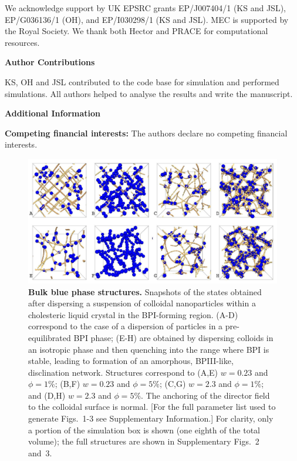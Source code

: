 \documentclass[12pt]{article}
\begin{document}
\noindent
We acknowledge support by UK EPSRC grants EP/J007404/1 (KS and JSL), 
EP/G036136/1 (OH), and EP/I030298/1 (KS and JSL).
MEC is supported by the Royal Society.
We thank both Hector and PRACE for computational resources.

\bigskip
\noindent
\textbf{\large Author Contributions}

\noindent
KS, OH and JSL contributed to the code base for simulation and performed
simulations. All authors helped to analyse the results and write the
manuscript.

\bigskip
\noindent
\textbf{\large Additional Information}

\noindent
\textbf{Competing financial interests:} The authors declare no competing
financial interests.

\newpage

\begin{figure}

\centerline{\includegraphics[width=\textwidth]{text-fig1.jpg}}
\caption{\textbf{Bulk blue phase structures.} Snapshots of the states
obtained after dispersing
a suspension of colloidal nanoparticles within a cholesteric liquid
crystal in the BPI-forming region. (A-D) correspond to the case
of a dispersion of particles in a pre-equilibrated BPI phase;
(E-H) are obtained by dispersing colloids in an isotropic
phase and then quenching into the range where BPI is stable, leading to formation of an amorphous, BPIII-like, disclination network.
Structures correspond
to (A,E) $w=0.23$ and $\phi=1\%$;
(B,F) $w=0.23$ and $\phi=5\%$; 
(C,G) $w=2.3$ and $\phi=1\%$; and
(D,H) $w=2.3$ and $\phi=5\%$.
The anchoring of the director field to the colloidal surface is normal.
[For the full parameter list used to generate Figs.~1-3 see Supplementary
Information.] For clarity, only a portion of the simulation box is shown
(one eighth of the total volume); the full structures are shown in
Supplementary Figs.~2 and~3.}
\end{figure}
\end{document}

